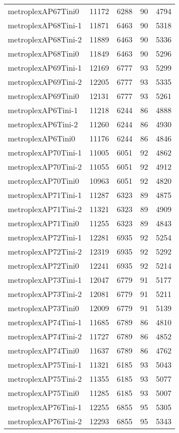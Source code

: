\documentclass[../../../thesis.tex]{subfiles}
\begin{document}
\begin{longtable}{lrrrr}
metroplexAP67Tini0 & 11172 & 6288 & 90 & 4794 \\
metroplexAP68Tini-1 & 11871 & 6463 & 90 & 5318 \\
metroplexAP68Tini-2 & 11889 & 6463 & 90 & 5336 \\
metroplexAP68Tini0 & 11849 & 6463 & 90 & 5296 \\
metroplexAP69Tini-1 & 12169 & 6777 & 93 & 5299 \\
metroplexAP69Tini-2 & 12205 & 6777 & 93 & 5335 \\
metroplexAP69Tini0 & 12131 & 6777 & 93 & 5261 \\
metroplexAP6Tini-1 & 11218 & 6244 & 86 & 4888 \\
metroplexAP6Tini-2 & 11260 & 6244 & 86 & 4930 \\
metroplexAP6Tini0 & 11176 & 6244 & 86 & 4846 \\
metroplexAP70Tini-1 & 11005 & 6051 & 92 & 4862 \\
metroplexAP70Tini-2 & 11055 & 6051 & 92 & 4912 \\
metroplexAP70Tini0 & 10963 & 6051 & 92 & 4820 \\
metroplexAP71Tini-1 & 11287 & 6323 & 89 & 4875 \\
metroplexAP71Tini-2 & 11321 & 6323 & 89 & 4909 \\
metroplexAP71Tini0 & 11255 & 6323 & 89 & 4843 \\
metroplexAP72Tini-1 & 12281 & 6935 & 92 & 5254 \\
metroplexAP72Tini-2 & 12319 & 6935 & 92 & 5292 \\
metroplexAP72Tini0 & 12241 & 6935 & 92 & 5214 \\
metroplexAP73Tini-1 & 12047 & 6779 & 91 & 5177 \\
metroplexAP73Tini-2 & 12081 & 6779 & 91 & 5211 \\
metroplexAP73Tini0 & 12009 & 6779 & 91 & 5139 \\
metroplexAP74Tini-1 & 11685 & 6789 & 86 & 4810 \\
metroplexAP74Tini-2 & 11727 & 6789 & 86 & 4852 \\
metroplexAP74Tini0 & 11637 & 6789 & 86 & 4762 \\
metroplexAP75Tini-1 & 11321 & 6185 & 93 & 5043 \\
metroplexAP75Tini-2 & 11355 & 6185 & 93 & 5077 \\
metroplexAP75Tini0 & 11285 & 6185 & 93 & 5007 \\
metroplexAP76Tini-1 & 12255 & 6855 & 95 & 5305 \\
metroplexAP76Tini-2 & 12293 & 6855 & 95 & 5343 \\

\end{longtable}
\end{document}
